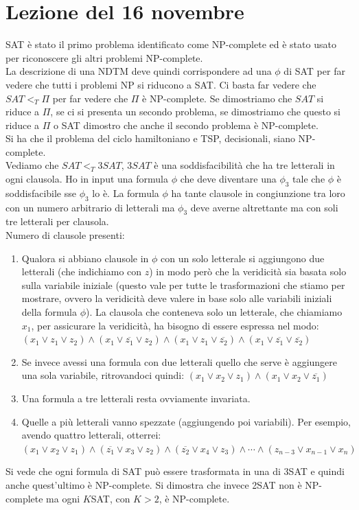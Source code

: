 \section{Lezione del 16 novembre}
SAT è stato il primo problema identificato come NP-complete ed è stato usato per riconoscere gli altri problemi NP-complete.\\ La descrizione di una NDTM deve quindi corrispondere ad una $\phi$ di SAT per far vedere che tutti i problemi NP si riducono a SAT. Ci basta far vedere che $SAT<_T \Pi$ per far vedere che $\Pi$ è NP-complete. Se dimostriamo che $SAT$ si riduce a $\Pi$, se ci si presenta un secondo problema, se dimostriamo che questo si riduce a $\Pi$ o SAT dimostro che anche il secondo problema è NP-complete. \\ 

Si ha che il problema del ciclo hamiltoniano e TSP, decisionali, siano NP-complete.\\ 

Vediamo che $SAT<_T 3SAT$, $3SAT$ è una soddisfacibilità che ha tre letterali in ogni clausola. Ho in input una formula $\phi$ che deve diventare una $\phi_3$ tale che $\phi$ è soddisfacibile sse $\phi_3$ lo è. 
La formula $\phi$ ha tante clausole in congiunzione tra loro con un numero arbitrario di letterali ma $\phi_3$ deve averne altrettante ma con soli tre letterali per clausola. \\
Numero di clausole presenti: 
\begin{enumerate}
    \item Qualora si abbiano clausole in $\phi$ con un solo letterale si aggiungono due letterali (che indichiamo con $z$) in modo però che la veridicità sia basata solo sulla variabile iniziale (questo vale per tutte le trasformazioni che stiamo per mostrare, ovvero la veridicità deve valere in base solo alle variabili iniziali della formula $\phi$). La clausola che conteneva solo un letterale, che chiamiamo $x_1$, per assicurare la veridicità, ha bisogno di essere espressa nel modo: $(x_1\lor z_1\lor z_2)\land (x_1\lor \overline{ z_1}\lor z_2)\land (x_1\lor z_1\lor\overline{ z_2})\land(x_1\lor\overline{ z_1}\lor\overline{ z_2})$
    \item Se invece avessi una formula con due letterali quello che serve è aggiungere una sola variabile, ritrovandoci quindi: $(x_1\lor x_2\lor z_1)\land (x_1\lor x_2\lor \overline{ z_1})$
    \item Una formula a tre letterali resta ovviamente invariata.
    \item Quelle a più letterali vanno spezzate (aggiungendo poi variabili). Per esempio, avendo quattro letterali, otterrei: $(x_1\lor x_2\lor z_1)\land (\overline{ z_1}\lor x_3\lor z_2)\land (\overline{ z_2}\lor x_4\lor z_3)\land\cdots\land(z_{n-3}\lor x_{n-1}\lor x_n)$
\end{enumerate}
Si vede che ogni formula di SAT può essere trasformata in una di 3SAT e quindi anche quest'ultimo è NP-complete. Si dimostra che invece 2SAT non è NP-complete ma ogni $K$SAT, con $K>2$, è NP-complete.\\ 

